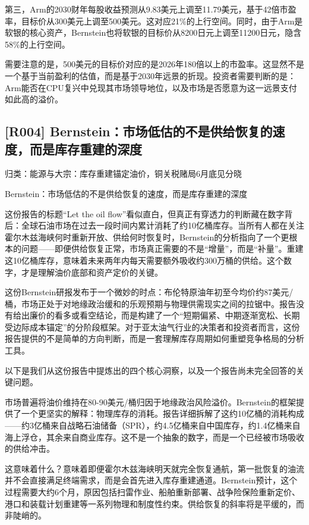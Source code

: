 \documentclass[11pt]{ctexart}
\begin{document}
第三，Arm的2030财年每股收益预测从9.83美元上调至11.79美元，基于42倍市盈率，目标价从300美元上调至500美元。这对应21\%的上行空间。同时，由于Arm是软银的核心资产，Bernstein也将软银的目标价从8200日元上调至11200日元，隐含58\%的上行空间。

需要注意的是，500美元的目标价对应的是2026年180倍以上的市盈率。这显然不是一个基于当前盈利的估值，而是基于2030年远景的折现。投资者需要判断的是：Arm能否在CPU复兴中兑现其市场领导地位，以及市场是否愿意为这一远景支付如此高的溢价。

\subsection{[R004] Bernstein：市场低估的不是供给恢复的速度，而是库存重建的深度}
{\small\color{refgray}归类：能源与大宗：库存重建锚定油价，铜关税赌局6月底见分晓}

Bernstein：市场低估的不是供给恢复的速度，而是库存重建的深度

这份报告的标题“Let the oil flow”看似直白，但真正有穿透力的判断藏在数字背后：全球石油市场在过去一段时间内累计消耗了约10亿桶库存。当所有人都在关注霍尔木兹海峡何时重新开放、供给何时恢复时，Bernstein的分析指向了一个更根本的问题——即便供给恢复正常，市场真正需要的不是“增量”，而是“补量”。重建这10亿桶库存，意味着未来两年内每天需要额外吸收约300万桶的供给。这个数字，才是理解油价底部和资产定价的关键。

这份Bernstein研报发布于一个微妙的时点：布伦特原油年初至今均价约87美元/桶，市场正处于对地缘政治缓和的乐观预期与物理供需现实之间的拉锯中。报告没有给出廉价的看多或看空结论，而是构建了一个“短期偏紧、中期逐渐宽松、长期受边际成本锚定”的分阶段框架。对于亚太油气行业的决策者和投资者而言，这份报告提供的不是简单的方向判断，而是一套理解库存周期如何重塑竞争格局的分析工具。

以下是我们从这份报告中提炼出的四个核心洞察，以及一个报告尚未完全回答的关键问题。

市场普遍将油价维持在80-90美元/桶归因于地缘政治风险溢价。Bernstein的框架提供了一个更坚实的解释：物理库存的消耗。报告详细拆解了这约10亿桶的消耗构成——约3亿桶来自战略石油储备（SPR），约4.5亿桶来自中国库存，约1.4亿桶来自海上浮仓，其余来自商业库存。这不是一个抽象的数字，而是一个已经被市场吸收的供给冲击。

这意味着什么？意味着即便霍尔木兹海峡明天就完全恢复通航，第一批恢复的油流并不会直接满足终端需求，而是会首先进入库存重建通道。Bernstein预计，这个过程需要大约6个月，原因包括扫雷作业、船舶重新部署、战争险保险重新定价、港口和装载计划重建等一系列物理和制度性约束。供给恢复的斜率将是平缓的，而非陡峭的。
\end{document}
